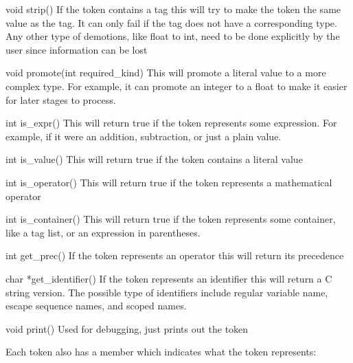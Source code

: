 \begin{cprototypelist}
  \item[void strip()] If the token contains a tag this will try
  to make the token the same value as the tag.  It can only fail if the tag
  does not have a corresponding \SCML{} type.  Any other type of demotions, like
  float to int, need to be done explicitly by the user since information can be
  lost

  \item[void promote(int required_kind)] This will promote a
  literal value to a more complex \SCML{} type.  For example, it can promote an
  integer to a float to make it easier for later stages to process.

  \item[int is_expr()] This will return true if the token
  represents some expression.  For example, if it were an addition,
  subtraction, or just a plain value.

  \item[int is_value()] This will return true if the token
  contains a literal value

  \item[int is_operator()] This will return true if the token
  represents a mathematical operator

  \item[int is_container()] This will return true if the token
  represents some container, like a tag list, or an expression in parentheses.

  \item[int get_prec()] If the token represents an operator this
  will return its precedence

  \item[char *get_identifier()] If the token represents an
  identifier this will return a C string version.  The possible type of
  identifiers include regular variable name, escape sequence names, and scoped
  names.

  \item[void print()] Used for debugging, just prints out the
  token
\end{cprototypelist}
%
Each token also has a  member which indicates what the token
represents:

